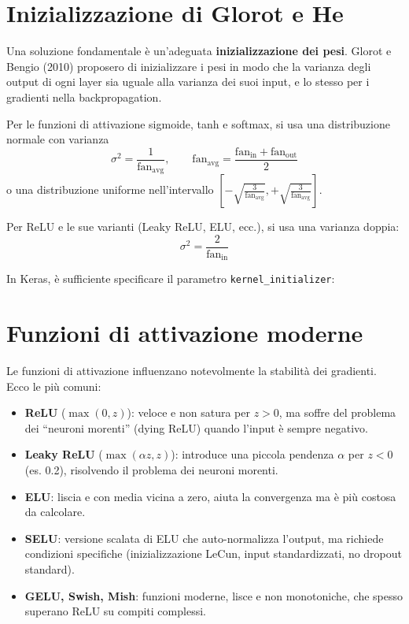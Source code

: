 \section{Inizializzazione di Glorot e He}

Una soluzione fondamentale è un'adeguata \textbf{inizializzazione dei pesi}. Glorot e Bengio (2010) proposero di inizializzare i pesi in modo che la varianza degli output di ogni layer sia uguale alla varianza dei suoi input, e lo stesso per i gradienti nella backpropagation.

\begin{defbox}
Per le funzioni di attivazione sigmoide, tanh e softmax, si usa una distribuzione normale con varianza
\[
\sigma^2 = \frac{1}{\text{fan}_{\text{avg}}}, \qquad \text{fan}_{\text{avg}} = \frac{\text{fan}_{\text{in}} + \text{fan}_{\text{out}}}{2}
\]
o una distribuzione uniforme nell'intervallo $\left[-\sqrt{\frac{3}{\text{fan}_{\text{avg}}}}, +\sqrt{\frac{3}{\text{fan}_{\text{avg}}}}\right]$.
\end{defbox}

\begin{defbox}
Per ReLU e le sue varianti (Leaky ReLU, ELU, ecc.), si usa una varianza doppia:
\[
\sigma^2 = \frac{2}{\text{fan}_{\text{in}}}
\]
\end{defbox}

In Keras, è sufficiente specificare il parametro \texttt{kernel\_initializer}:
\section{Funzioni di attivazione moderne}

Le funzioni di attivazione influenzano notevolmente la stabilità dei gradienti. Ecco le più comuni:

\begin{itemize}
    \item \textbf{ReLU} ($\max(0, z)$): veloce e non satura per $z>0$, ma soffre del problema dei ``neuroni morenti'' (dying ReLU) quando l'input è sempre negativo.
    \item \textbf{Leaky ReLU} ($\max(\alpha z, z)$): introduce una piccola pendenza $\alpha$ per $z<0$ (es. 0.2), risolvendo il problema dei neuroni morenti.
    \item \textbf{ELU}: liscia e con media vicina a zero, aiuta la convergenza ma è più costosa da calcolare.
    \item \textbf{SELU}: versione scalata di ELU che auto-normalizza l'output, ma richiede condizioni specifiche (inizializzazione LeCun, input standardizzati, no dropout standard).
    \item \textbf{GELU, Swish, Mish}: funzioni moderne, lisce e non monotoniche, che spesso superano ReLU su compiti complessi.
\end{itemize}

